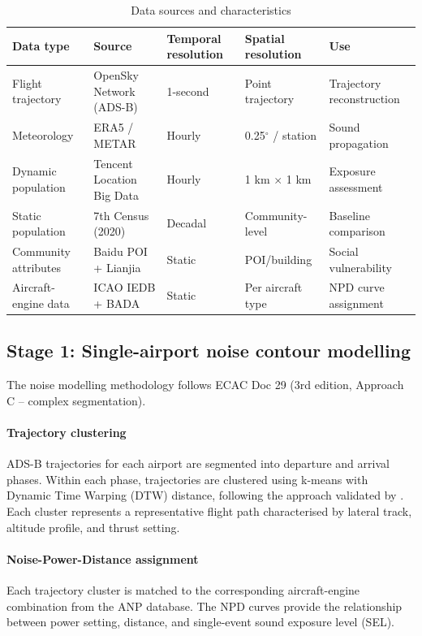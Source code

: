 \documentclass[review,12pt]{elsarticle}
\begin{document}
\begin{table}[h]
\centering
\caption{Data sources and characteristics}
\label{tab:data_sources}
\begin{tabular}{@{}lllll@{}}
\toprule
Data type & Source & Temporal resolution & Spatial resolution & Use \\
\midrule
Flight trajectory & OpenSky Network (ADS-B) & 1-second & Point trajectory & Trajectory reconstruction \\
Meteorology & ERA5 / METAR & Hourly & 0.25$^\circ$ / station & Sound propagation \\
Dynamic population & Tencent Location Big Data & Hourly & 1 km $\times$ 1 km & Exposure assessment \\
Static population & 7th Census (2020) & Decadal & Community-level & Baseline comparison \\
Community attributes & Baidu POI + Lianjia & Static & POI/building & Social vulnerability \\
Aircraft-engine data & ICAO IEDB + BADA & Static & Per aircraft type & NPD curve assignment \\
\bottomrule
\end{tabular}
\end{table}

\subsection{Stage 1: Single-airport noise contour modelling}

The noise modelling methodology follows ECAC Doc 29 (3rd edition, Approach C -- complex segmentation).

\paragraph{Trajectory clustering}
ADS-B trajectories for each airport are segmented into departure and arrival phases. Within each phase, trajectories are clustered using k-means with Dynamic Time Warping (DTW) distance, following the approach validated by \citet{pretto2024aircraft}. Each cluster represents a representative flight path characterised by lateral track, altitude profile, and thrust setting.

\paragraph{Noise-Power-Distance assignment}
Each trajectory cluster is matched to the corresponding aircraft-engine combination from the ANP database. The NPD curves provide the relationship between power setting, distance, and single-event sound exposure level (SEL).
\end{document}
